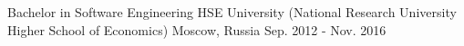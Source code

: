 
\begin{cventries}

  \cventry
    {Bachelor in Software Engineering} %
    {}
    {HSE University (National Research University Higher School of Economics)} %
    {}
    {Moscow, Russia} %
    {Sep. 2012 - Nov. 2016} %
    {}

\end{cventries}
